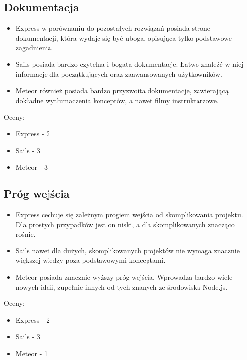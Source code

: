 \documentclass[12pt]{report}
\begin{document}
    \subsection{Dokumentacja}
      \begin{itemize}
        \item Express w porównaniu do pozostałych rozwiązań posiada strone dokumentacji, która wydaje się być uboga, opisująca tylko podstawowe zagadnienia.
        \item Sails posiada bardzo czytelna i bogata dokumentacje. Łatwo znaleźć w niej informacje dla początkujących oraz zaawansowanych użytkowników.
        \item Meteor również posiada bardzo przyzwoita dokumentacje, zawierającą dokładne wytłumaczenia konceptów, a nawet filmy instruktarzowe.
      \end{itemize}
      Oceny:
      \begin{itemize}
        \item Express - 2
        \item Sails - 3
        \item Meteor - 3
      \end{itemize}
      
    \subsection{Próg wejścia}
      \begin{itemize}
        \item Express cechuje się zależnym progiem wejścia od skomplikowania projektu. Dla prostych przypadków jest on niski, a dla skomplikowanych znacząco rośnie.
        \item Sails nawet dla dużych, skomplikowanych projektów nie wymaga znacznie większej wiedzy poza podstawowymi konceptami. 
        \item Meteor posiada znacznie wyższy próg wejścia. Wprowadza bardzo wiele nowych ideii, zupełnie innych od tych znanych ze środowiska Node.js.
      \end{itemize}
      Oceny:
      \begin{itemize}
        \item Express - 2
        \item Sails - 3
        \item Meteor - 1
      \end{itemize}
      
\end{document}
